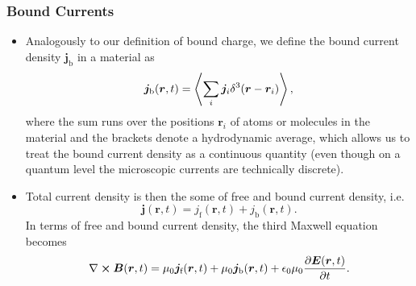 \documentclass[11pt, a4paper]{article}
\renewcommand{\vec}[1]{\bm{#1}} %
\renewcommand{\r}{\vec{r}}
\newcommand{\E}{\vec{E}} %
\newcommand{\B}{\vec{B}} %
\newcommand{\ee}{\epsilon_{0}}  %
\newcommand{\mm}{\mu_{0}}  %
\renewcommand{\j}{\vec{j}}  %
\renewcommand{\curl}{\nabla \cross}
\begin{document}
\subsubsection{Bound Currents}
\begin{itemize}
	\item Analogously to our definition of bound charge, we define the bound current density $ \j_{\text{b}} $ in a material as
	\begin{equation*}
		\j_{\text{b}}(\r, t) = \ev{\sum_{i}\j_{i}\delta^{3}(\r - \r_{i})},
	\end{equation*}
    where the sum runs over the positions $ \r_{i} $ of atoms or molecules in the material and the brackets denote a hydrodynamic average, which allows us to treat the bound current density as a continuous quantity (even though on a quantum level the microscopic currents are technically discrete).

    \item Total current density is then the some of free and bound current density, i.e.
    \begin{equation*}
        \j(\r, t) = j_{\text{f}}(\r, t) + j_{\text{b}}(\r, t).
    \end{equation*}
    In terms of free and bound current density, the third Maxwell equation becomes
	\begin{equation*}
		\curl \B(\r, t) = \mm \j_{\text{f}}(\r, t) + \mm \j_{\text{b}}(\r, t) + \ee \mm \pdv{\E(\r, t)}{t}.
	\end{equation*}
\end{itemize}
\end{document}
